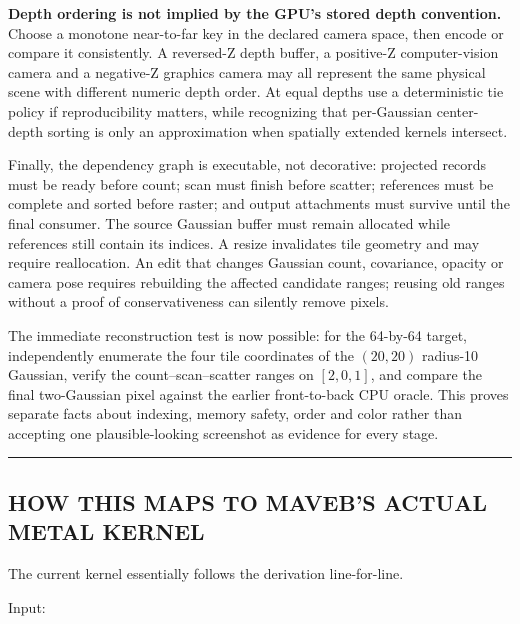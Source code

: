\textbf{Depth ordering is not implied by the GPU's stored depth convention.} Choose a monotone near-to-far key in the declared camera space, then encode or compare it consistently. A reversed-Z depth buffer, a positive-Z computer-vision camera and a negative-Z graphics camera may all represent the same physical scene with different numeric depth order. At equal depths use a deterministic tie policy if reproducibility matters, while recognizing that per-Gaussian center-depth sorting is only an approximation when spatially extended kernels intersect.

Finally, the dependency graph is executable, not decorative: projected records must be ready before count; scan must finish before scatter; references must be complete and sorted before raster; and output attachments must survive until the final consumer. The source Gaussian buffer must remain allocated while references still contain its indices. A resize invalidates tile geometry and may require reallocation. An edit that changes Gaussian count, covariance, opacity or camera pose requires rebuilding the affected candidate ranges; reusing old ranges without a proof of conservativeness can silently remove pixels.

The immediate reconstruction test is now possible: for the 64-by-64 target, independently enumerate the four tile coordinates of the \((20,20)\) radius-10 Gaussian, verify the count--scan--scatter ranges on \([2,0,1]\), and compare the final two-Gaussian pixel against the earlier front-to-back CPU oracle. This proves separate facts about indexing, memory safety, order and color rather than accepting one plausible-looking screenshot as evidence for every stage.

\begin{center}\rule{0.5\linewidth}{0.5pt}\end{center}

\subsection{HOW THIS MAPS TO MAVEB'S ACTUAL METAL KERNEL}\label{04-visual-computing-ii-ch038-how-this-maps-to-mavebs-actual-metal-kernel}

\hypertarget{04-visual-computing-ii-ch038-how-this-maps-to-mavebs-actual-metal-kernel}{}

The current  kernel essentially follows the derivation line-for-line.

Input:

